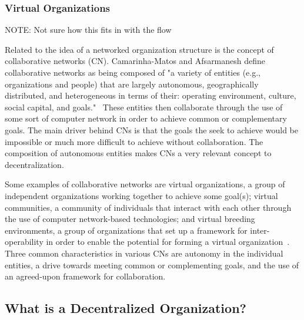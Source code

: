 \subsubsection{Virtual Organizations}

NOTE: Not sure how this fits in with the flow

Related to the idea of a networked organization structure is the concept of collaborative networks (CN). Camarinha-Matos and Afsarmanesh define collaborative networks as being composed of "a variety of entities (e.g., organizations and people) that are largely autonomous, geographically distributed, and heterogeneous in terms of their: operating environment, culture, social capital, and goals."~\cite{Camarinha-Matos2005} These entities then collaborate through the use of some sort of computer network in order to achieve common or complementary goals. The main driver behind CNs is that the goals the seek to achieve would be impossible or much more difficult to achieve without collaboration. The composition of autonomous entities makes CNs a very relevant concept to decentralization. 

Some examples of collaborative networks are virtual organizations, a group of independent organizations working together to achieve some goal(s); virtual communities, a community of individuals that interact with each other through the use of computer network-based technologies; and virtual breeding environments, a group of organizations that set up a framework for inter-operability in order to enable the potential for forming a virtual organization~\cite{Camarinha-Matos2005}. Three common characteristics in various CNs are autonomy in the individual entities, a drive towards meeting common or complementing goals, and the use of an agreed-upon framework for collaboration. 





\subsection{What is a Decentralized Organization?}

